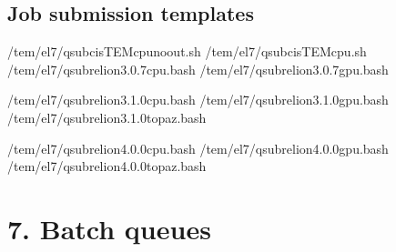 \documentclass[a4paper,11pt,english]{sphinxmanual}
\begin{document}
\subsection{Job submission templates}
\label{\detokenize{newfarm:job-submission-templates}}
\begin{sphinxVerbatim}[commandchars=\\\{\}]
/tem/el7/qsub\PYGZhy{}cisTEM\PYGZhy{}cpu\PYGZhy{}noout.sh
/tem/el7/qsub\PYGZhy{}cisTEM\PYGZhy{}cpu.sh
/tem/el7/qsub\PYGZhy{}relion\PYGZhy{}3.0.7\PYGZhy{}cpu.bash
/tem/el7/qsub\PYGZhy{}relion\PYGZhy{}3.0.7\PYGZhy{}gpu.bash

/tem/el7/qsub\PYGZhy{}relion\PYGZhy{}3.1.0\PYGZhy{}cpu.bash
/tem/el7/qsub\PYGZhy{}relion\PYGZhy{}3.1.0\PYGZhy{}gpu.bash
/tem/el7/qsub\PYGZhy{}relion\PYGZhy{}3.1.0\PYGZhy{}topaz.bash

/tem/el7/qsub\PYGZhy{}relion\PYGZhy{}4.0.0\PYGZhy{}cpu.bash
/tem/el7/qsub\PYGZhy{}relion\PYGZhy{}4.0.0\PYGZhy{}gpu.bash
/tem/el7/qsub\PYGZhy{}relion\PYGZhy{}4.0.0\PYGZhy{}topaz.bash
\end{sphinxVerbatim}


\section{7. Batch queues}
\label{\detokenize{newfarm:batch-queues}}
\end{document}
